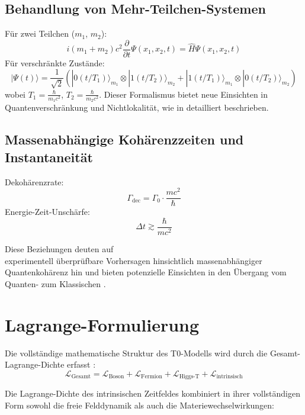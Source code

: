 \documentclass[12pt,a4paper]{article}
\begin{document}
	\subsection{Behandlung von Mehr-Teilchen-Systemen}
	Für zwei Teilchen (\( m_1 \), \( m_2 \)):
	\begin{equation}
		i (m_1 + m_2) c^2 \frac{\partial}{\partial t} \Psi(x_1, x_2, t) = \hat{H} \Psi(x_1, x_2, t)
	\end{equation}
	Für verschränkte Zustände:
	\begin{equation}
		|\Psi(t)\rangle = \frac{1}{\sqrt{2}}(|0(t/T_1)\rangle_{m_1} \otimes |1(t/T_2)\rangle_{m_2} + |1(t/T_1)\rangle_{m_1} \otimes |0(t/T_2)\rangle_{m_2})
	\end{equation}
	wobei \( T_1 = \frac{\hbar}{m_1 c^2} \), \( T_2 = \frac{\hbar}{m_2 c^2} \). Dieser Formalismus bietet neue Einsichten in Quantenverschränkung und Nichtlokalität, wie in \cite{pascher_feldtheorie_2025} detailliert beschrieben.
	
	\subsection{Massenabhängige Kohärenzzeiten und Instantaneität}
	Dekohärenzrate:
	\begin{equation}
		\Gamma_{\text{dec}} = \Gamma_0 \cdot \frac{m c^2}{\hbar}
	\end{equation}
	Energie-Zeit-Unschärfe:
	\begin{equation}
		\Delta t \gtrsim \frac{\hbar}{mc^2}
	\end{equation}
	
	Diese Beziehungen deuten auf \\experimentell überprüfbare Vorhersagen hinsichtlich massenabhängiger Quantenkohärenz hin und bieten potenzielle Einsichten in den Übergang vom Quanten- zum Klassischen \cite{pascher_erweiterung_2025}.
\section{Lagrange-Formulierung}
Die vollständige mathematische Struktur des T0-Modells wird durch die Gesamt-Lagrange-Dichte erfasst \cite{pascher_lagrange_2025}:
\begin{equation}
	\mathcal{L}_{\text{Gesamt}} = \mathcal{L}_{\text{Boson}} + \mathcal{L}_{\text{Fermion}} + \mathcal{L}_{\text{Higgs-T}} + \mathcal{L}_{\text{intrinsisch}}
\end{equation}

Die Lagrange-Dichte des intrinsischen Zeitfeldes kombiniert in ihrer vollständigen Form sowohl die freie Felddynamik als auch die Materiewechselwirkungen:
\end{document}
